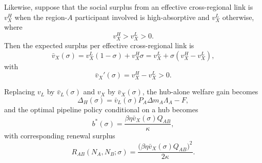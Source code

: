 Likewise, suppose that the social surplus from an effective cross-regional link is $v_X^H$ when the region-$A$ participant involved is high-absorptive and $v_X^L$ otherwise, where
\[
v_X^H>v_X^L>0.
\]
Then the expected surplus per effective cross-regional link is
\begin{equation}
\bar v_X(\sigma)
=
v_X^L(1-\sigma)+v_X^H\sigma
=
v_X^L+\sigma(v_X^H-v_X^L),
\label{eq:vbarX_sigma}
\end{equation}
with
\begin{equation}
\bar v_X'(\sigma)=v_X^H-v_X^L>0.
\label{eq:vbarX_prime}
\end{equation}

Replacing $v_L$ by $\bar v_L(\sigma)$ and $v_X$ by $\bar v_X(\sigma)$, the hub-alone welfare gain becomes
\begin{equation}
\Delta_H(\sigma)
=
\bar v_L(\sigma)P_A\Delta m_A\Lambda_A-F,
\label{eq:DeltaH_sigma}
\end{equation}
and the optimal pipeline policy conditional on a hub becomes
\begin{equation}
b^*(\sigma)
=
\frac{\beta\eta \bar v_X(\sigma)Q_{AB}}{\kappa},
\label{eq:bstar_sigma}
\end{equation}
with corresponding renewal surplus
\begin{equation}
R_{AB}(N_A,N_B;\sigma)
=
\frac{\bigl(\beta\eta \bar v_X(\sigma)Q_{AB}\bigr)^2}{2\kappa}.
\label{eq:R_sigma}
\end{equation}

